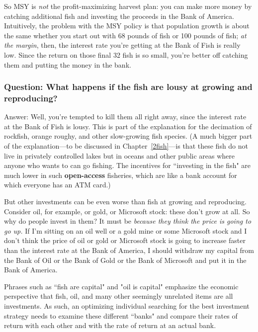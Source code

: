 So MSY is \emph{not} the profit-maximizing harvest plan: you can make more money by catching additional fish and investing the proceeds in the Bank of America. Intuitively, the problem with the MSY policy is that population growth is about the same whether you start out with 68 pounds of fish or 100 pounds of fish; \emph{at the margin}, then, the interest rate you're getting at the Bank of Fish is really low. Since the return on those final 32 fish is so small, you're better off catching them and putting the money in the bank.

\subsubsection{Question\rm : What happens if the fish are lousy at growing and reproducing?}

Answer: Well, you're tempted to kill them all right away, since the interest rate at the Bank of Fish is lousy. This is part of the explanation for the decimation of rockfish, orange roughy, and other slow-growing fish species. (A much bigger part of the explanation---to be discussed in Chapter~\ref{2fish}---is that these fish do not live in privately controlled lakes but in oceans and other public areas where anyone who wants to can go fishing. The incentives for ``investing in the fish" are much lower in such \textbf{open-access} fisheries, which are like a bank account for which everyone has an ATM card.) 

But other investments can be even worse than fish at growing and reproducing. Consider oil, for example, or gold, or Microsoft stock: these don't grow at all. So why do people invest in them? It must be \emph{because they think the price is going to go up.} If I'm sitting on an oil well or a gold mine or some Microsoft stock and I don't think the price of oil or gold or Microsoft stock is going to increase faster than the interest rate at the Bank of America, I should withdraw my capital from the Bank of Oil or the Bank of Gold or the Bank of Microsoft and put it in the Bank of America.

Phrases such as ``fish are capital" and "oil is capital" emphasize the economic perspective that fish, oil, and many other seemingly unrelated items are all investments. As such, an optimizing individual searching for the best investment strategy needs to examine these different ``banks" and compare their rates of return with each other and with the rate of return at an actual bank.

